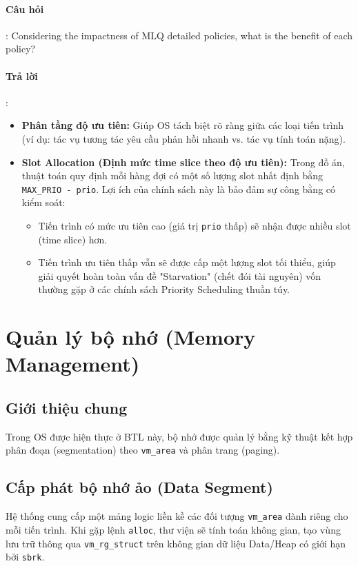\documentclass[a4paper]{article}
\begin{document}
\paragraph{Câu hỏi}: Considering the impactness of MLQ detailed policies, what is the benefit of each policy?

\paragraph{Trả lời}:
\begin{itemize}
    \item \textbf{Phân tầng độ ưu tiên:} Giúp OS tách biệt rõ ràng giữa các loại tiến trình (ví dụ: tác vụ tương tác yêu cầu phản hồi nhanh vs. tác vụ tính toán nặng).
    \item \textbf{Slot Allocation (Định mức time slice theo độ ưu tiên):} Trong đồ án, thuật toán quy định mỗi hàng đợi có một số lượng slot nhất định bằng \texttt{MAX\_PRIO - prio}. Lợi ích của chính sách này là bảo đảm sự công bằng có kiểm soát:
          \begin{itemize}
              \item Tiến trình có mức ưu tiên cao (giá trị \texttt{prio} thấp) sẽ nhận được nhiều slot (time slice) hơn.
              \item Tiến trình ưu tiên thấp vẫn sẽ được cấp một lượng slot tối thiểu, giúp giải quyết hoàn toàn vấn đề "Starvation" (chết đói tài nguyên) vốn thường gặp ở các chính sách Priority Scheduling thuần túy.
          \end{itemize}
\end{itemize}

\pagebreak

\section{Quản lý bộ nhớ (Memory Management)}

\subsection{Giới thiệu chung}
Trong OS được hiện thực ở BTL này, bộ nhớ được quản lý bằng kỹ thuật kết hợp phân đoạn (segmentation) theo \texttt{vm\_area} và phân trang (paging).

\subsection{Cấp phát bộ nhớ ảo (Data Segment)}
Hệ thống cung cấp một mảng logic liền kề các đối tượng \texttt{vm\_area} dành riêng cho mỗi tiến trình. Khi gặp lệnh \texttt{alloc}, thư viện sẽ tính toán không gian, tạo vùng lưu trữ thông qua \texttt{vm\_rg\_struct} trên không gian dữ liệu Data/Heap có giới hạn bởi \texttt{sbrk}.
\end{document}
